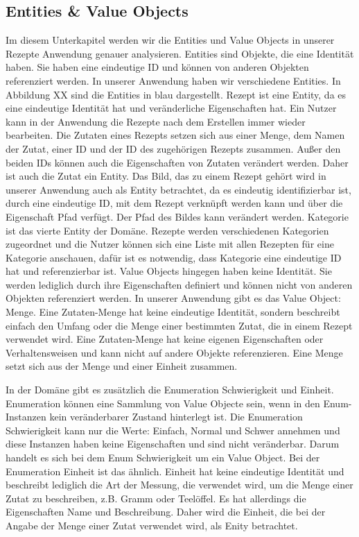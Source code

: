 \subsection{Entities \& Value Objects}
Im diesem Unterkapitel werden wir die Entities und Value Objects in unserer Rezepte Anwendung genauer analysieren. Entities sind Objekte, die eine Identität haben. Sie haben eine eindeutige ID und können von anderen Objekten referenziert werden. In unserer Anwendung haben wir verschiedene Entities. In Abbildung XX sind die Entities in blau dargestellt.
Rezept ist eine Entity, da es eine eindeutige Identität hat und veränderliche Eigenschaften hat. Ein Nutzer kann in der Anwendung die Rezepte nach dem Erstellen immer wieder bearbeiten. Die  Zutaten eines Rezepts setzen sich aus einer Menge, dem Namen der Zutat, einer ID und der ID des zugehörigen Rezepts zusammen. Außer den beiden IDs können auch die Eigenschaften von Zutaten verändert werden. Daher ist auch die Zutat ein Entity. Das Bild, das zu einem Rezept gehört wird in unserer Anwendung auch als Entity betrachtet, da es eindeutig identifizierbar ist, durch eine eindeutige ID, mit dem Rezept verknüpft werden kann und über die Eigenschaft Pfad verfügt. Der Pfad des Bildes kann verändert werden. Kategorie ist das vierte Entity der Domäne. Rezepte werden verschiedenen Kategorien zugeordnet und die Nutzer können sich eine Liste mit allen Rezepten für eine Kategorie anschauen, dafür ist es notwendig, dass Kategorie eine eindeutige ID hat und referenzierbar ist. 
Value Objects hingegen haben keine Identität. Sie werden lediglich durch ihre Eigenschaften definiert und können nicht von anderen Objekten referenziert werden. In unserer Anwendung gibt es das Value Object: Menge. Eine Zutaten-Menge hat keine eindeutige Identität, sondern beschreibt einfach den Umfang oder die Menge einer bestimmten Zutat, die in einem Rezept verwendet wird. Eine Zutaten-Menge hat keine eigenen Eigenschaften oder Verhaltensweisen und kann nicht auf andere Objekte referenzieren. Eine Menge setzt sich aus der Menge und einer Einheit zusammen. 

In der Domäne gibt es zusätzlich die Enumeration Schwierigkeit und Einheit. Enumeration können eine Sammlung von Value Objecte sein, wenn in den Enum-Instanzen kein veränderbarer Zustand hinterlegt ist. Die Enumeration Schwierigkeit kann nur die Werte: Einfach, Normal und Schwer annehmen und diese Instanzen haben keine Eigenschaften und sind nicht veränderbar. Darum handelt es sich bei dem Enum Schwierigkeit um ein Value Object. Bei der Enumeration Einheit ist das ähnlich. Einheit hat keine eindeutige Identität und beschreibt lediglich die Art der Messung, die verwendet wird, um die Menge einer Zutat zu beschreiben, z.B. Gramm oder Teelöffel. Es hat allerdings die Eigenschaften Name und Beschreibung. Daher wird die Einheit, die bei der Angabe der Menge einer Zutat verwendet wird, als Enity betrachtet.

